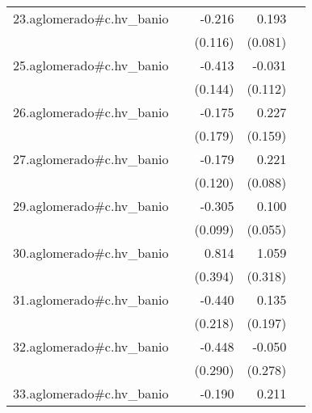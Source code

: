 {\begin{longtable}{l*{4}{D{.}{.}{-1}}}
\addlinespace
23.aglomerado#c.hv\_banio&                     &      -0.216         &       0.193\sym{*}  &                     \\
            &                     &     (0.116)         &     (0.081)         &                     \\
\addlinespace
25.aglomerado#c.hv\_banio&                     &      -0.413\sym{**} &      -0.031         &                     \\
            &                     &     (0.144)         &     (0.112)         &                     \\
\addlinespace
26.aglomerado#c.hv\_banio&                     &      -0.175         &       0.227         &                     \\
            &                     &     (0.179)         &     (0.159)         &                     \\
\addlinespace
27.aglomerado#c.hv\_banio&                     &      -0.179         &       0.221\sym{*}  &                     \\
            &                     &     (0.120)         &     (0.088)         &                     \\
\addlinespace
29.aglomerado#c.hv\_banio&                     &      -0.305\sym{**} &       0.100         &                     \\
            &                     &     (0.099)         &     (0.055)         &                     \\
\addlinespace
30.aglomerado#c.hv\_banio&                     &       0.814\sym{*}  &       1.059\sym{***}&                     \\
            &                     &     (0.394)         &     (0.318)         &                     \\
\addlinespace
31.aglomerado#c.hv\_banio&                     &      -0.440\sym{*}  &       0.135         &                     \\
            &                     &     (0.218)         &     (0.197)         &                     \\
\addlinespace
32.aglomerado#c.hv\_banio&                     &      -0.448         &      -0.050         &                     \\
            &                     &     (0.290)         &     (0.278)         &                     \\
\addlinespace
33.aglomerado#c.hv\_banio&                     &      -0.190\sym{*}  &       0.211\sym{***}&                     \\

\end{longtable}}
